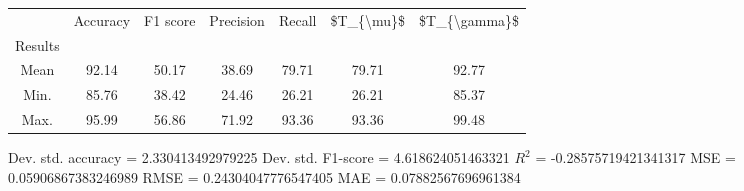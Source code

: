 \begin{tabular}{|c|c|c|c|c|c|c|}
\toprule
{} &  Accuracy &  F1 score &  Precision &  Recall &  \$T\_\{\textbackslash mu\}\$ &  \$T\_\{\textbackslash gamma\}\$ \\
Results &           &           &            &         &            &               \\
\hline
Mean    &     92.14 &     50.17 &      38.69 &   79.71 &      79.71 &         92.77 \\
Min.    &     85.76 &     38.42 &      24.46 &   26.21 &      26.21 &         85.37 \\
Max.    &     95.99 &     56.86 &      71.92 &   93.36 &      93.36 &         99.48 \\
\bottomrule
\end{tabular}

 Dev. std. accuracy = 2.330413492979225
 Dev. std. F1-score = 4.618624051463321
 $R^2$ = -0.28575719421341317
 MSE = 0.05906867383246989
 RMSE = 0.24304047776547405
 MAE = 0.07882567696961384